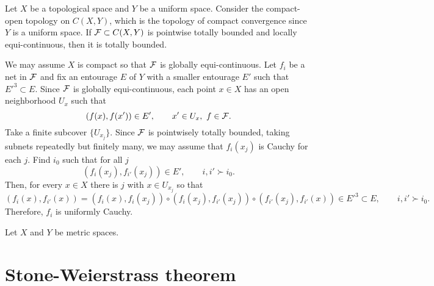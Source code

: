 \documentclass{../../large}
\begin{document}
\begin{prb}
Let $X$ be a topological space and $Y$ be a uniform space.
Consider the compact-open topology on $C(X,Y)$, which is the topology of compact convergence since $Y$ is a uniform space.
If $\mathcal{F}\subset C(X,Y)$ is pointwise totally bounded and locally equi-continuous, then it is totally bounded.
\begin{parts}
\item
\end{parts}
\end{prb}
\begin{pf}
We may assume $X$ is compact so that $\mathcal{F}$ is globally equi-continuous.
Let $f_i$ be a net in $\mathcal{F}$ and fix an entourage $E$ of $Y$ with a smaller entourage $E'$ such that $E'^3\subset E$.
Since $\mathcal{F}$ is globally equi-continuous, each point $x\in X$ has an open neighborhood $U_x$ such that
\[(f(x),f(x'))\in E',\qquad x'\in U_x,\ f\in\mathcal{F}.\]
Take a finite subcover $\{U_{x_j}\}$.
Since $\mathcal{F}$ is pointwisely totally bounded, taking subnets repeatedly but finitely many, we may assume that $f_i(x_j)$ is Cauchy for each $j$.
Find $i_0$ such that for all $j$
\[(f_i(x_j),f_{i'}(x_j))\in E',\qquad i,i'\succ i_0.\]
Then, for every $x\in X$ there is $j$ with $x\in U_{x_j}$ so that
\[(f_i(x),f_{i'}(x))=(f_i(x),f_i(x_j))\circ(f_i(x_j),f_{i'}(x_j))\circ(f_{i'}(x_j),f_{i'}(x))\in E'^3\subset E,\qquad i,i'\succ i_0.\]
Therefore, $f_i$ is uniformly Cauchy.
\end{pf}


\begin{prb}
Let $X$ and $Y$ be metric spaces.
\end{prb}


\section{Stone-Weierstrass theorem}
\end{document}
